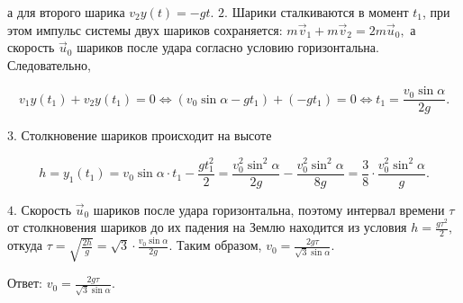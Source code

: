 \documentclass[12pt,a4paper]{article}
\begin{document}
{а для второго шарика $v _2y ( t ) = - gt.$
$2$.  Шарики сталкиваются в момент $t_{1}$, при этом импульс системы двух шариков сохраняется: $m \vec v _1 + m \vec v _2 = 2m \vec u_0,$ а скорость $\vec u_0$ шариков после удара согласно условию горизонтальна. Следовательно,

\[v _1y ( t_1 ) + v _2y ( t_1 ) = 0 \Longleftrightarrow ( v _0 \sin \alpha - gt_1 ) + ( - gt_1 ) = 0 \Longleftrightarrow t_1 = \frac{v _0 \sin \alpha}{2g} .\]

$3$.  Столкновение шариков происходит на высоте

\[h = y_1 ( t_1 ) = v _0 \sin \alpha \cdot t_1 - \frac{gt_1 ^2}{2} = \frac{v _0 ^2 \sin ^2 \alpha}{2g} - \frac{v _0 ^2 \sin ^2 \alpha}{8g} = \frac{3}{8} \cdot \frac{v _0 ^2 \sin ^2 \alpha}{g} .\]

$4$.  Скорость $\vec u_0$ шариков после удара горизонтальна, поэтому интервал времени $\tau$ от столкновения шариков до их падения на Землю находится из условия $h = \frac{g \tau ^2}{2} ,$ откуда $\tau = \sqrt{\frac{2h}{g}} = \sqrt{3} \cdot \frac{v _0 \sin \alpha}{2g} .$ Таким образом, $v _0 = \frac{2g \tau}{\sqrt{3} \sin \alpha} .$

Ответ: $v _0 = \frac{2g \tau}{\sqrt{3} \sin \alpha} .$
}
\end{document}
